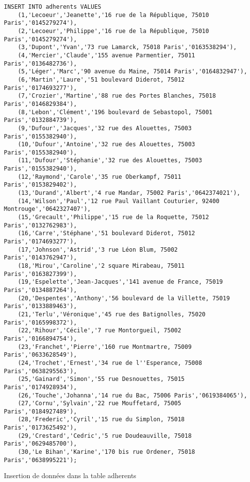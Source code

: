 \documentclass{article}
\begin{document}
\begin{listing}[H]
	\begin{verbatim}
INSERT INTO adherents VALUES 
	(1,'Lecoeur','Jeanette','16 rue de la République, 75010 Paris','0145279274'),
	(2,'Lecoeur','Philippe','16 rue de la République, 75010 Paris','0145279274'),
	(3,'Dupont','Yvan','73 rue Lamarck, 75018 Paris','0163538294'),
	(4,'Mercier','Claude','155 avenue Parmentier, 75011 Paris','0136482736'),
	(5,'Léger','Marc','90 avenue du Maine, 75014 Paris','0164832947'),
	(6,'Martin','Laure','51 boulevard Diderot, 75012 Paris','0174693277'),
	(7,'Crozier','Martine','88 rue des Portes Blanches, 75018 Paris','0146829384'),
	(8,'Lebon','Clément','196 boulevard de Sebastopol, 75001 Paris','0132884739'),
	(9,'Dufour','Jacques','32 rue des Alouettes, 75003 Paris','0155382940'),
	(10,'Dufour','Antoine','32 rue des Alouettes, 75003 Paris','0155382940'),
	(11,'Dufour','Stéphanie','32 rue des Alouettes, 75003 Paris','0155382940'),
	(12,'Raymond','Carole','35 rue Oberkampf, 75011 Paris','0153829402'),
	(13,'Durand','Albert','4 rue Mandar, 75002 Paris','0642374021'),
	(14,'Wilson','Paul','12 rue Paul Vaillant Couturier, 92400 Montrouge','0642327407'),
	(15,'Grecault','Philippe','15 rue de la Roquette, 75012 Paris','0132762983'),
	(16,'Carre','Stéphane','51 boulevard Diderot, 75012 Paris','0174693277'),
	(17,'Johnson','Astrid','3 rue Léon Blum, 75002 Paris','0143762947'),
	(18,'Mirou','Caroline','2 square Mirabeau, 75011 Paris','0163827399'),
	(19,'Espelette','Jean-Jacques','141 avenue de France, 75019 Paris','0134887264'),
	(20,'Despentes','Anthony','56 boulevard de la Villette, 75019 Paris','0133889463'),
	(21,'Terlu','Véronique','45 rue des Batignolles, 75020 Paris','0165998372'),
	(22,'Rihour','Cécile','7 rue Montorgueil, 75002 Paris','0166894754'),
	(23,'Franchet','Pierre','160 rue Montmartre, 75009 Paris','0633628549'),
	(24,'Trochet','Ernest','34 rue de l''Esperance, 75008 Paris','0638295563'),
	(25,'Gainard','Simon','55 rue Desnouettes, 75015 Paris','0174928934'),
	(26,'Touche','Johanna','14 rue du Bac, 75006 Paris','0619384065'),
	(27,'Cornu','Sylvain','22 rue Mouffetard, 75005 Paris','0184927489'),
	(28,'Frederic','Cyril','15 rue du Simplon, 75018 Paris','0173625492'),
	(29,'Crestard','Cedric','5 rue Doudeauville, 75018 Paris','0629485700'),
	(30,'Le Bihan','Karine','170 bis rue Ordener, 75018 Paris','0638995221');
\end{verbatim}
	\caption{Insertion de données dans la table adherents}
\end{listing}
\end{document}
